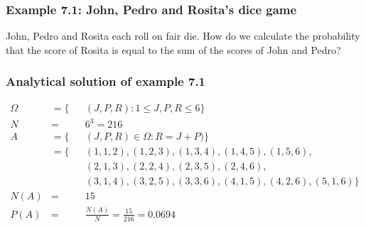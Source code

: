 \begin{frame}
    \frametitle{Example 7.1: John, Pedro and Rosita's dice game}

    \begin{manualProbExample}{7.1}
        John, Pedro and Rosita each roll on fair die. How do we calculate the
        probability that the score of Rosita is equal to the sum of the scores
        of John and Pedro?
    \end{manualProbExample}


\end{frame}

\begin{frame}
    \frametitle{Analytical solution of example 7.1}

    \begin{alignat*}{2}
        \Omega&=\{&&(J,P,R):1\le J,P,R\le 6\}\\
        N&=&&6^3=216\\
        A&=\{&&(J,P,R)\in\Omega:R=J+P)\}\\
         &=\{&&(1,1,2),(1,2,3),(1,3,4),(1,4,5),(1,5,6),\\
         &   &&(2,1,3),(2,2,4),(2,3,5),(2,4,6),\\
         &   &&(3,1,4),(3,2,5),(3,3,6),(4,1,5),(4,2,6),(5,1,6)\}\\
        N(A)&=&&15\\
        P(A)&=&&\frac{N(A)}{N}=\frac{15}{216}=0.0694
    \end{alignat*}

\end{frame}


